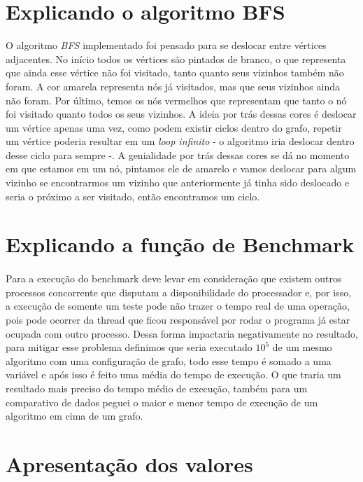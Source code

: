 \documentclass[12pt]{article}
\begin{document}
    \section{Explicando o algoritmo BFS}

    O algoritmo \emph{BFS} implementado foi pensado para se deslocar entre vértices adjacentes. No início todos os vértices são pintados de branco, o que representa que ainda esse vértice não foi visitado, tanto quanto seus vizinhos também não foram. A cor amarela representa nós já visitados, mas que seus vizinhos ainda não foram. Por último, temos os nós vermelhos que representam que tanto o nó foi visitado quanto todos os seus vizinhos. A ideia por trás dessas cores é deslocar um vértice apenas uma vez, como podem existir ciclos dentro do grafo, repetir um vértice poderia resultar em um \emph{loop infinito} - o algoritmo iria deslocar dentro desse ciclo para sempre -. A genialidade por trás dessas cores se dá no momento em que estamos em um nó, pintamos ele de amarelo e vamos deslocar para algum vizinho se encontrarmos um vizinho que anteriormente já tinha sido deslocado e seria o próximo a ser visitado, então encontramos um ciclo.

    \section{Explicando a função de Benchmark} \label{sec:benckmark}

     \paragraph{} Para a execução do benchmark deve levar em consideração que existem outros processos 
     concorrente que disputam a disponibilidade do processador e, por isso, a execução de somente um teste pode
      não trazer o tempo real de uma operação, pois pode ocorrer da thread que ficou responsável por rodar o 
      programa já estar ocupada com outro processo. Dessa forma impactaria negativamente no resultado, para
       mitigar esse problema definimos que seria executado $10^5$ de um mesmo algoritmo  com uma configuração de 
       grafo, todo esse tempo é somado a uma variável e após isso é feito uma média do tempo de execução. 
       O que traria um resultado mais preciso do tempo médio de execução, também para um comparativo de dados 
       peguei o maior e menor tempo de execução de um algoritmo em cima de um grafo. 
        
       \section{Apresentação dos valores} \label{sec:resultados}
\end{document}
